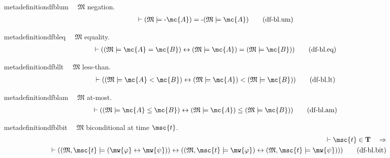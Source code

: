 \begin{restatable}{metadefinition}{dfblum}~~ $\mathfrak{M}$ negation.
\begin{align}
\vdash ( \mathfrak{M} \models \textrm{-} \mc{A} ) = \textrm{-} ( \mathfrak{M}
    \models \mc{A} )\label{eq:df-bl.um}\tag{df-bl.um}
\end{align}
\end{restatable}

\begin{restatable}{metadefinition}{dfbleq}~~ $\mathfrak{M}$ equality.
\begin{align}
\vdash ( ( \mathfrak{M} \models \mc{A} = \mc{B} ) \leftrightarrow (
    \mathfrak{M} \models \mc{A} ) = ( \mathfrak{M} \models \mc{B} )
    )\label{eq:df-bl.eq}\tag{df-bl.eq}
\end{align}
\end{restatable}

\begin{restatable}{metadefinition}{dfbllt}~~ $\mathfrak{M}$ less-than.
\begin{align}
\vdash ( ( \mathfrak{M} \models \mc{A} < \mc{B} ) \leftrightarrow (
    \mathfrak{M} \models \mc{A} ) < ( \mathfrak{M} \models \mc{B} )
    )\label{eq:df-bl.lt}\tag{df-bl.lt}
\end{align}
\end{restatable}

\begin{restatable}{metadefinition}{dfblam}~~ $\mathfrak{M}$ at-most.
\begin{align}
\vdash ( ( \mathfrak{M} \models \mc{A} \le \mc{B} ) \leftrightarrow (
    \mathfrak{M} \models \mc{A} ) \le ( \mathfrak{M} \models \mc{B} )
    )\label{eq:df-bl.am}\tag{df-bl.am}
\end{align}
\end{restatable}

\begin{restatable}{metadefinition}{dfblbit}~~ $\mathfrak{M}$ biconditional at time
$\msc{t}$.
\begin{align}
\vdash \msc{t} \in \mathbf{T}\quad\Rightarrow \notag \\ 
	\quad \vdash ( ( \mathfrak{M} ,
    \msc{t} \models ( \mw{\varphi} \leftrightarrow \mw{\psi} ) )
    \leftrightarrow ( ( \mathfrak{M} , \msc{t} \models \mw{\varphi} )
    \leftrightarrow ( \mathfrak{M} , \msc{t} \models \mw{\psi} ) )
    )\label{eq:df-bl.bit}\tag{df-bl.bit}
\end{align}
\end{restatable}

